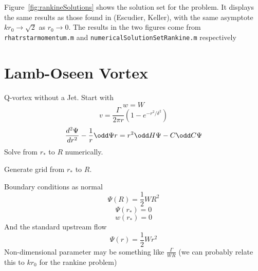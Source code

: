 \documentclass{X:/Documents/Coding/Latex/myreport}
\begin{document}
Figure~\ref{fig:rankineSolutions} shows the solution set for the problem. It displays the same results as those found in (Escudier, Keller), with the same asymptote $kr_0 \to \sqrt{2}$ as $r_0 \to 0$. The results in the two figures come from \verb|rhatrstarmomentum.m| and \verb|numericalSolutionSetRankine.m| respectively
%

%


\clearpage
\section{Lamb-Oseen Vortex}
Q-vortex without a Jet.
Start with 
\[w = W\]
\[v = \frac{\Gamma}{2\pi r} \left(1 - e^{-r^2/\delta^2}\right)\]
\[\frac{d^2\Psi}{dr^2} - \frac1r \odd \Psi r = r^2 \odd H\Psi - C \odd C\Psi \]
Solve from $r_*$ to $R$ numerically.

Generate grid from $r_*$ to $R$.

Boundary conditions as normal
\[\Psi(R) = \frac12 WR^2\]
\[\Psi(r_*) = 0\]
\[w(r_*) = 0\]
And the standard upstream flow 
\[\Psi(r)  =\frac12 Wr^2\]
Non-dimensional parameter may be something like $\frac{\Gamma}{WR}$ (we can probably relate this to $kr_0$ for the rankine problem)
\end{document}
